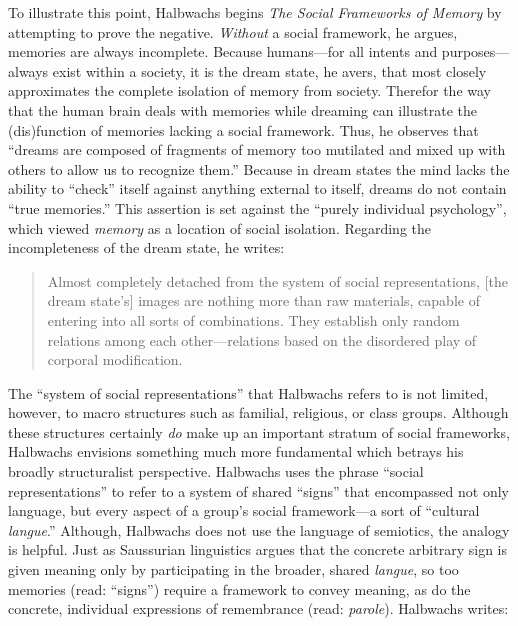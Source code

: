 To illustrate this point, Halbwachs begins \emph{The Social Frameworks
of Memory} by attempting to prove the negative. \emph{Without} a social
framework, he argues, memories are always incomplete. Because
humans---for all intents and purposes---always exist within a society,
it is the dream state, he avers, that most closely approximates the
complete isolation of memory from society. Therefor the way that the
human brain deals with memories while dreaming can illustrate the
(dis)function of memories lacking a social framework. Thus, he observes
that ``dreams are composed of fragments of memory too mutilated and
mixed up with others to allow us to recognize them.'' Because in dream
states the mind lacks the ability to ``check'' itself against anything
external to itself, dreams do not contain ``true
memories.''\autocite[41]{halbwachs1992} This assertion is set against
the ``purely individual psychology'',\autocites[E.g., Bergson, and
Freud.
See][]{ansellpearson_radstone-schwarz2011}[and][]{terdiman_radstone-schwarz2011}
which viewed \emph{memory} as a location of social isolation. Regarding
the incompleteness of the dream state, he writes:

\begin{quote}
Almost completely detached from the system of social representations,
{[}the dream state's{]} images are nothing more than raw materials,
capable of entering into all sorts of combinations. They establish only
random relations among each other---relations based on the disordered
play of corporal modification.\autocite[42]{halbwachs1992}
\end{quote}

The ``system of social representations'' that Halbwachs refers to is not
limited, however, to macro structures such as familial, religious, or
class groups. Although these structures certainly \emph{do} make up an
important stratum of social frameworks, Halbwachs envisions something
much more fundamental which betrays his broadly structuralist
perspective. Halbwachs uses the phrase ``social representations'' to
refer to a system of shared ``signs'' that encompassed not only
language, but every aspect of a group's social framework---a sort of
``cultural \emph{langue}.'' Although, Halbwachs does not use the
language of semiotics, the analogy is helpful. Just as Saussurian
linguistics argues that the concrete arbitrary sign is given meaning
only by participating in the broader, shared \emph{langue}, so too
memories (read: ``signs'') require a framework to convey meaning, as do
the concrete, individual expressions of remembrance (read:
\emph{parole}). Halbwachs writes:

